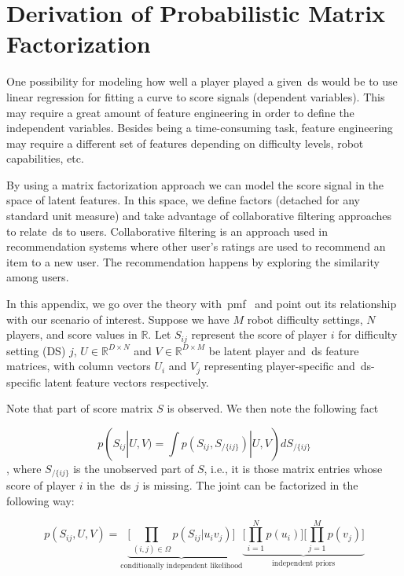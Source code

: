 \chapter{Derivation of Probabilistic Matrix Factorization}\label{app:pmf}
\small
One possibility for modeling how well a player played a given~\gls{ds} would be to use linear regression for fitting a curve to score signals (dependent variables). This may require a great amount of feature engineering in order to define the independent variables. Besides being a time-consuming task, feature engineering may require a different set of features depending on difficulty levels, robot capabilities, etc. 

By using a matrix factorization approach we can model the score signal in the space of latent features. In this space, we define factors (detached for any standard unit measure) and take advantage of collaborative filtering approaches to relate~\gls{ds} to users. Collaborative filtering is an approach used in recommendation systems where other user's ratings are used to recommend an item to a new user. The recommendation happens by exploring the similarity among users.

In this appendix, we go over the theory with~\gls{pmf}~\citep{mnih_probabilistic_2008} and point out its relationship with our scenario of interest. Suppose we have $M$ robot difficulty settings, $N$ players, and score values in $\mathbb{R}$. Let $S_{ij}$ represent the score of player $i$ for difficulty setting (DS) $j$, $U \in \mathbb{R}^{D\times N}$ and $V \in \mathbb{R}^{D\times M}$ be latent player and~\gls{ds} feature matrices, with column vectors $U_i$ and $V_j$ representing player-specific and~\gls{ds}-specific latent feature vectors respectively.  

Note that part of score matrix $S$ is observed. We then note the following fact

\begin{equation}
p(S_{ij} | U, V) = \int p(S_{ij}, S_{/\{ij\}} ) | U, V)dS_{/\{ij\}}
\end{equation}
, where $S_{/\{ij\}}$ is the unobserved part of $S$, i.e., it is those matrix entries whose score of player $i$ in the~\gls{ds} $j$ is missing. The joint can be factorized in the following way:

\begin{equation}
p(S_{ij},U,V) = \underbrace{\Bigg[\prod_{(i,j)\in\Omega} p(S_{ij}|u_{i}v_{j}) \Bigg]}_\text{conditionally independent likelihood} \underbrace{\Bigg[\prod_{i=1}^{N}p(u_{i})\Bigg] \Bigg[\prod_{j=1}^{M}p(v_{j})\Bigg]}_\text{independent priors}
\end{equation}


